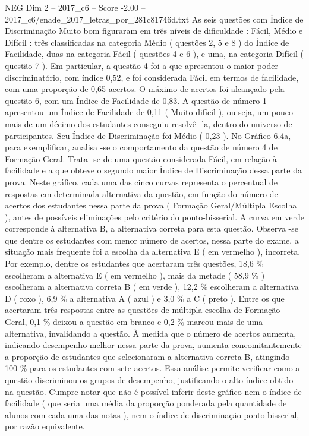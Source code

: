 \begin{textsample}{NEG Dim 2 – 2017\_c6 – Score -2.00 – 2017\_c6/enade\_2017\_letras\_por\_281c81746d.txt}
As seis questões com Índice de Discriminação Muito bom figuraram em três níveis de dificuldade : Fácil, Médio e Difícil : três classificadas na categoria Médio ( questões 2, 5 e 8 ) do Índice de Facilidade, duas na categoria Fácil ( questões 4 e 6 ), e uma, na categoria Difícil ( questão 7 ).
Em particular, a questão 4 foi a que apresentou o maior poder discriminatório, com índice 0,52, e foi considerada Fácil em termos de facilidade, com uma proporção de 0,65 acertos.
O máximo de acertos foi alcançado pela questão 6, com um Índice de Facilidade de 0,83.
A questão de número 1 apresentou um Índice de Facilidade de 0,11 ( Muito difícil ), ou seja, um pouco mais de um décimo dos estudantes conseguiu resolvê -la, dentro do universo de participantes.
Seu Índice de Discriminação foi Médio ( 0,23 ).
No Gráfico 6.4a, para exemplificar, analisa -se o comportamento da questão de número 4 de Formação Geral.
Trata -se de uma questão considerada Fácil, em relação à facilidade e a que obteve o segundo maior Índice de Discriminação dessa parte da prova.
Neste gráfico, cada uma das cinco curvas representa o percentual de respostas em determinada alternativa da questão, em função do número de acertos dos estudantes nessa parte da prova ( Formação Geral/Múltipla Escolha ), antes de possíveis eliminações pelo critério do ponto-bisserial.
A curva em verde corresponde à alternativa B, a alternativa correta para esta questão.
Observa -se que dentre os estudantes com menor número de acertos, nessa parte do exame, a situação mais frequente foi a escolha da alternativa E ( em vermelho ), incorreta.
Por exemplo, dentre os estudantes que acertaram três questões, 18,6 \% escolheram a alternativa E ( em vermelho ), mais da metade ( 58,9 \% ) escolheram a alternativa correta B ( em verde ), 12,2 \% escolheram a alternativa D ( roxo ), 6,9 \% a alternativa A ( azul ) e 3,0 \% a C ( preto ).
Entre os que acertaram três respostas entre as questões de múltipla escolha de Formação Geral, 0,1 \% deixou a questão em branco e 0,2 \% marcou mais de uma alternativa, invalidando a questão.
À medida que o número de acertos aumenta, indicando desempenho melhor nessa parte da prova, aumenta concomitantemente a proporção de estudantes que selecionaram a alternativa correta B, atingindo 100 \% para os estudantes com sete acertos.
Essa análise permite verificar como a questão discriminou os grupos de desempenho, justificando o alto índice obtido na questão.
Cumpre notar que não é possível inferir deste gráfico nem o índice de facilidade ( que seria uma média da proporção ponderada pela quantidade de alunos com cada uma das notas ), nem o índice de discriminação ponto-bisserial, por razão equivalente.

\end{textsample}
